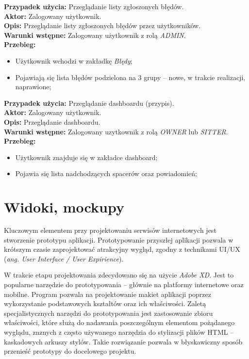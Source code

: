 \noindent
\textbf{Przypadek użycia:} Przeglądanie listy zgłoszonych błędów. \\
\textbf{Aktor:} Zalogowany użytkownik. \\
\textbf{Opis:} Przeglądanie listy zgłoszonych błędów przez użytkowników. \\
\textbf{Warunki wstępne:} Zalogowany użytkownik z rolą \textit{ADMIN}. \\
\textbf{Przebieg:}
\begin{itemize}[leftmargin=1cm]
    \item Użytkownik wchodzi w zakładkę \textit{Błędy};
    \item Pojawiają się lista błędów podzielona na 3 grupy -- nowe, w trakcie realizacji, naprawione;
\end{itemize}

\noindent
\textbf{Przypadek użycia:} Przeglądanie dashboardu (przypis). \\
\textbf{Aktor:} Zalogowany użytkownik. \\
\textbf{Opis:} Przeglądanie dashboardu. \\
\textbf{Warunki wstępne:} Zalogowany uzytkownik z rolą \textit{OWNER} lub \textit{SITTER}. \\
\textbf{Przebieg:}
\begin{itemize}[leftmargin=1cm]
    \item Użytkownik znajduje się w zakładce dashboard;
    \item Pojawia się lista nadchodzących spacerów oraz powiadomień;
\end{itemize}

\section{Widoki, mockupy}
Kluczowym elementem przy projektowaniu serwisów internetowych jest stworzenie prototypu aplikacji. Prototypowanie przyszłej aplikacji pozwala w krótszym czasie zaprojektować atrakcyjny wygląd, zgodny z technikami UI/UX (\textit{ang. User Interface / User Expirience}).

W trakcie etapu projektowania zdecydowano się na użycie \textit{Adobe XD}. Jest to popularne narzędzie do prototypowania -- głównie na platformy internetowe oraz mobilne. Program pozwala na projektowanie makiet aplikacji poprzez wykorzystanie podstawowych kształtów oraz ich właściwości. Zaletą specjalistycznych narzędzi do prototypowania jest zastosowanie zbioru właściwości, które służą do nadawania poszczególnym elementom pożądanego wyglądu, znznych z często używanego narzędzia do stylizacji plików HTML -- kaskadowych arkuszy stylów. Takie rozwiązanie pozwala w błyskawiczny sposób przenieść prototypy do docelowego projektu.

